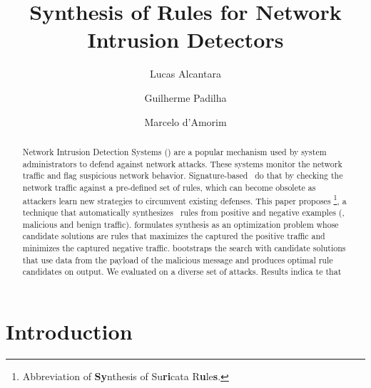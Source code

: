 \documentclass[runningheads]{llncs}
\begin{document}
%
\title{Synthesis of Rules for Network Intrusion Detectors}
%
%
\author{Lucas Alcantara \and
Guilherme Padilha \and
Marcelo d'Amorim}
%
%
%
\maketitle              %
%
\begin{abstract}
Network Intrusion Detection Systems (\nids{}) are a popular mechanism
used by system administrators to defend against network attacks. These
systems monitor the network traffic and flag suspicious network
behavior. Signature-based \nids\ do that by checking the network
traffic against a pre-defined set of rules, which can become obsolete
as attackers learn new strategies to circumvent existing defenses.
This paper proposes \tname{}\footnote{Abbreviation of \textbf{Sy}nthesis of
  Su\textbf{ri}cata R\textbf{u}le\textbf{s}.}, a technique that automatically
synthesizes \nids\ rules from positive and negative examples (\ie{},
malicious and benign traffic). \tname{} formulates synthesis as an
optimization problem whose candidate solutions are rules that
maximizes the captured the positive traffic and minimizes the captured
negative traffic. \tname{} bootstraps the search with candidate
solutions that use data from the payload of the malicious message and
produces optimal rule candidates on output. We evaluated \tname{} on a
diverse set of attacks. Results indica te that 



\end{abstract}
%
%
%
\section{Introduction}
\end{document}
